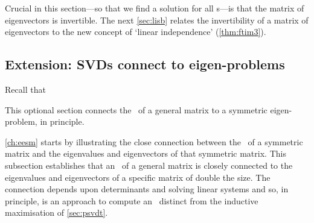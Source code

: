 Crucial in this section---so that we find a solution for all s---is that the matrix of eigenvectors is invertible.
The next \autoref{sec:lisb} relates the invertibility of a matrix of eigenvectors to the new concept of `linear independence' (\autoref{thm:ftim3}).

\subsection{Extension: SVDs connect to eigen-problems}

Recall that 
\begin{aside}
This optional section connects the \svd\ of a general matrix to a symmetric eigen-problem, in principle.
\end{aside}%
\autoref{ch:eesm} starts by illustrating the close connection between the \svd\ of a symmetric matrix and the eigenvalues and eigenvectors of that symmetric matrix.
This subsection establishes that an \svd\ of a general matrix is closely connected to the eigenvalues and eigenvectors of a specific matrix of double the size.   
The connection depends upon determinants and solving linear systems and so, in principle, is an approach to compute an \svd\ distinct from the inductive maximisation of \autoref{sec:psvdt}.



